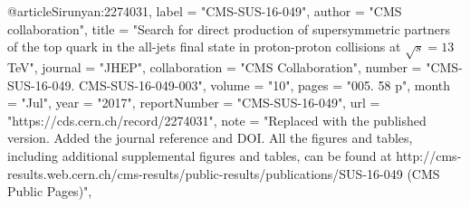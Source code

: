 @article{Sirunyan:2274031,
      label          = "CMS-SUS-16-049",
      author        = "{CMS collaboration}",
      title         = "{Search for direct production of supersymmetric partners
                       of the top quark in the all-jets final state in
                       proton-proton collisions at $ \sqrt{s}=13 $ TeV}",
      journal       = "JHEP",
      collaboration = "CMS Collaboration",
      number        = "CMS-SUS-16-049. CMS-SUS-16-049-003",
      volume        = "10",
      pages         = "005. 58 p",
      month         = "Jul",
      year          = "2017",
      reportNumber  = "CMS-SUS-16-049",
      url           = "https://cds.cern.ch/record/2274031",
      note          = "Replaced with the published version. Added the journal
                       reference and DOI. All the figures and tables, including
                       additional supplemental figures and tables, can be found at
                       http://cms-results.web.cern.ch/cms-results/public-results/publications/SUS-16-049
                       (CMS Public Pages)",
}

